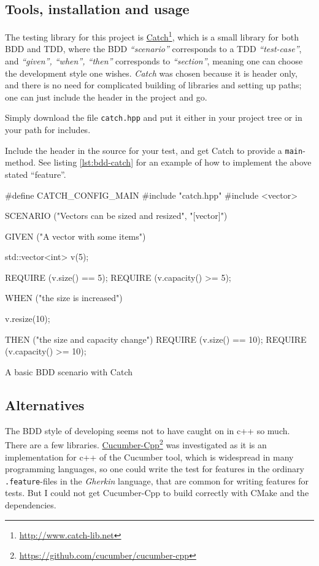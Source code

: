 \documentclass[../main.tex]{subfiles}
\begin{document}
\subsection{Tools, installation and usage}\label{catch-tool}
The testing library for this project is \href{http://www.catch-lib.net}{Catch}\footnote{\url{http://www.catch-lib.net}}, which is a small library for both BDD and TDD, where the BDD \emph{``scenario''} corresponds to a TDD \emph{``test-case''}, and \emph{``given'', ``when'', ``then''} corresponds to \emph{``section''}, meaning one can choose the development style one wishes. \emph{Catch} was chosen because it is header only, and there is no need for complicated building of libraries and setting up paths; one can just include the header in the project and go.

Simply download the file \texttt{catch.hpp} and put it either in your project tree or in your path for includes.

Include the header in the source for your test, and get Catch to provide a \texttt{main}-method. See listing \ref{lst:bdd-catch} for an example of how to implement the above stated ``feature''.

\begin{mylisting}
\begin{cppcode}
#define CATCH_CONFIG_MAIN
#include "catch.hpp"
#include <vector>

SCENARIO ("Vectors can be sized and resized", "[vector]") {
	GIVEN ("A vector with some items") {
		std::vector<int> v(5);

		REQUIRE (v.size() == 5);
		REQUIRE (v.capacity() >= 5);

		WHEN ("the size is increased") {
			v.resize(10);

			THEN ("the size and capacity change") {
				REQUIRE (v.size() == 10);
				REQUIRE (v.capacity() >= 10);
			}
		}
	}
}
\end{cppcode}
\caption{A basic BDD scenario with Catch}
\label{lst:bdd-catch}
\end{mylisting}

\subsection{Alternatives}
The BDD style of developing seems not to have caught on in c++ so much. There are a few libraries. \href{https://github.com/cucumber/cucumber-cpp}{Cucumber-Cpp}\footnote{\url{https://github.com/cucumber/cucumber-cpp}} was investigated as it is an implementation for c++ of the Cucumber tool, which is widespread in many programming languages, so one could write the test for features in the ordinary \texttt{.feature}-files in the \emph{Gherkin} language, that are common for writing features for tests. But I could not get Cucumber-Cpp to build correctly with CMake and the dependencies.
\end{document}
